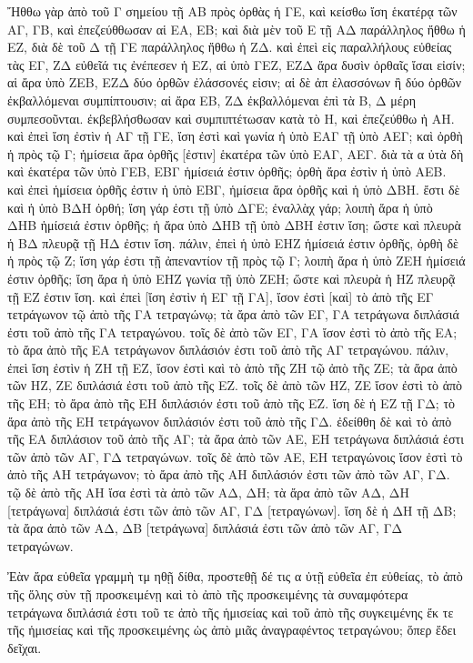 \begin{Parallel}{}{}
{{\greekfont Ἤθθω γὰρ ἀπὸ τοῦ Γ σημείου τῇ ΑΒ πρὸς ὀρθὰς ἡ ΓΕ, καὶ κείσθω ἴση ἑκατέρᾳ τῶν ΑΓ, ΓΒ, καὶ ἐπεζεύθθωσαν αἱ ΕΑ, ΕΒ; καὶ διὰ μὲν τοῦ Ε τῇ ΑΔ παράλληλος ἤθθω ἡ ΕΖ, διὰ δὲ τοῦ Δ τῇ ΓΕ παράλληλος ἤθθω ἡ ΖΔ. καὶ ἐπεὶ εἰς παραλλήλους εὐθείας τὰς ΕΓ, ΖΔ εὐθεῖά τις ἐνέπεσεν ἡ ΕΖ, αἱ ὑπὸ ΓΕΖ, ΕΖΔ ἄρα δυσὶν ὀρθαῖς ἴσαι εἰσίν; αἱ ἄρα ὑπὸ ΖΕΒ, ΕΖΔ δύο ὀρθῶν ἐλάσσονές εἰσιν;
αἱ  δὲ ἀπ ἐλασσόνων ἢ δύο ὀρθῶν ἐκβαλλόμεναι συμπίπτουσιν;
αἱ ἄρα ΕΒ, ΖΔ ἐκβαλλόμεναι ἐπὶ τὰ Β, Δ μέρη συμπεσοῦνται.
ἐκβεβλήσθωσαν καὶ συμπιπτέτωσαν κατὰ τὸ Η, καὶ ἐπεζεύθθω ἡ ΑΗ. καὶ ἐπεὶ ἴση ἐστὶν ἡ ΑΓ τῇ ΓΕ, ἴση ἐστὶ καὶ γωνία ἡ ὑπὸ ΕΑΓ τῇ ὑπὸ ΑΕΓ; καὶ ὀρθὴ ἡ πρὸς τῷ Γ; ἡμίσεια ἄρα 
ὀρθῆς [ἐστιν] ἑκατέρα τῶν ὑπὸ ΕΑΓ, ΑΕΓ. διὰ τὰ α ὐτὰ δὴ καὶ ἑκατέρα τῶν ὑπὸ ΓΕΒ, ΕΒΓ ἡμίσειά ἐστιν ὀρθῆς; ὀρθὴ ἄρα ἐστὶν ἡ ὑπὸ ΑΕΒ. καὶ ἐπεὶ ἡμίσεια ὀρθῆς ἐστιν ἡ ὑπὸ ΕΒΓ, ἡμίσεια ἄρα 
ὀρθῆς καὶ ἡ ὑπὸ ΔΒΗ. ἔστι δὲ καὶ ἡ 
ὑπὸ ΒΔΗ ὀρθή; ἴση γάρ ἐστι τῇ ὑπὸ ΔΓΕ; ἐναλλὰχ γάρ; 
λοιπὴ ἅρα ἡ ὑπὸ ΔΗΒ ἡμίσειά ἐστιν ὀρθῆς; ἡ 
ἄρα ὑπὸ ΔΗΒ τῇ ὑπὸ ΔΒΗ ἐστιν ἴση; ὥστε καὶ πλευρὰ ἡ ΒΔ πλευρᾷ τῇ ΗΔ ἐστιν ἴση.
πάλιν, ἐπεὶ ἡ ὑπὸ ΕΗΖ ἡμίσειά ἐστιν ὀρθῆς, ὀρθὴ δὲ ἡ πρὸς τῷ Ζ; ἴση γάρ ἐστι τῇ ἀπεναντίον τῇ πρὸς τῷ Γ; λοιπὴ ἄρα ἡ ὑπὸ ΖΕΗ ἡμίσειά ἐστιν
ὀρθῆς;  ἴση ἄρα ἡ ὑπὸ ΕΗΖ γωνία τῇ ὑπὸ ΖΕΗ; ὥστε
καὶ πλευρὰ ἡ ΗΖ πλευρᾷ τῇ ΕΖ ἐστιν ἴση. καὶ ἐπεὶ [ἴση ἐστὶν ἡ ΕΓ τῇ ΓΑ], ἴσον ἐστὶ [καὶ] τὸ ἀπὸ τῆς ΕΓ τετράγωνον τῷ ἀπὸ τῆς ΓΑ τετραγώνῳ; τὰ ἄρα ἀπὸ τῶν ΕΓ, ΓΑ τετράγωνα διπλάσιά
ἐστι τοῦ ἀπὸ τῆς ΓΑ τετραγώνου. τοῖς δὲ ἀπὸ τῶν ΕΓ, ΓΑ ἴσον
ἐστὶ τὸ ἀπὸ τῆς ΕΑ; τὸ ἄρα ἀπὸ τῆς ΕΑ τετράγωνον διπλάσιόν ἐστι τοῦ ἀπὸ τῆς ΑΓ τετραγώνου. πάλιν, ἐπεὶ ἴση ἐστὶν ἡ ΖΗ τῇ ΕΖ, 
ἴσον ἐστὶ καὶ τὸ ἀπὸ τῆς ΖΗ τῷ ἀπὸ τῆς ΖΕ; τὰ ἄρα ἀπὸ τῶν ΗΖ, ΖΕ διπλάσιά ἐστι τοῦ ἀπὸ τῆς ΕΖ. τοῖς δὲ ἀπὸ τῶν ΗΖ, ΖΕ
ἴσον ἐστὶ τὸ ἀπὸ τῆς ΕΗ; τὸ ἄρα ἀπὸ τῆς ΕΗ διπλάσιόν ἐστι
τοῦ ἀπὸ τῆς ΕΖ. ἴση δὲ ἡ ΕΖ τῇ ΓΔ; τὸ ἄρα ἀπὸ τῆς ΕΗ τετράγωνον διπλάσιόν ἐστι τοῦ ἀπὸ τῆς ΓΔ. ἐδείθθη δὲ καὶ τὸ ἀπὸ τῆς ΕΑ διπλάσιον
τοῦ ἀπὸ τῆς ΑΓ; τὰ ἄρα ἀπὸ τῶν ΑΕ, ΕΗ τετράγωνα διπλάσιά ἐστι τῶν ἀπὸ τῶν ΑΓ, ΓΔ τετραγώνων. τοῖς
δὲ ἀπὸ τῶν ΑΕ, ΕΗ τετραγώνοις ἴσον ἐστὶ τὸ ἀπὸ τῆς ΑΗ τετράγωνον; τὸ ἄρα ἀπὸ τῆς ΑΗ διπλάσιόν ἐστι τῶν ἀπὸ τῶν ΑΓ, ΓΔ. τῷ δὲ ἀπὸ τῆς ΑΗ ἴσα ἐστὶ τὰ ἀπὸ τῶν ΑΔ, ΔΗ; τὰ ἄρα
ἀπὸ τῶν ΑΔ, ΔΗ [τετράγωνα] διπλάσιά ἐστι τῶν ἀπὸ τῶν ΑΓ, ΓΔ [τετραγώνων]. ἴση δὲ ἡ ΔΗ τῇ ΔΒ; τὰ ἄρα ἀπὸ τῶν ΑΔ, ΔΒ [τετράγωνα] διπλάσιά ἐστι τῶν ἀπὸ τῶν ΑΓ, ΓΔ τετραγώνων.}

{\greekfont Ἐὰν ἄρα εὐθεῖα γραμμὴ τμ ηθῇ δίθα, προστεθῇ δέ τις α ὐτῇ εὐθεῖα  ἐπ εὐθείας, τὸ ἀπὸ τῆς ὅλης σὺν τῇ προσκειμένῃ
καὶ τὸ ἀπὸ τῆς προσκειμένης τὰ συναμφότερα τετράγωνα διπλάσιά ἐστι τοῦ τε ἀπὸ τῆς ἡμισείας καὶ τοῦ ἀπὸ τῆς συγκειμένης ἔκ τε τῆς ἡμισείας καὶ τῆς προσκειμένης ὡς ἀπὸ μιᾶς ἀναγραφέντος τετραγώνου; ὅπερ ἔδει δεῖχαι.}}


\end{Parallel}
